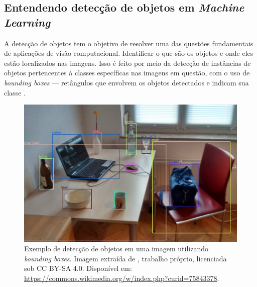 \subsection{Entendendo detecção de objetos em \emph{Machine Learning}}
A detecção de objetos tem o objetivo de resolver uma das questões fundamentais de aplicações de visão computacional. Identificar o que são os objetos e onde eles estão localizados nas imagens. Isso é feito por meio da detecção de instâncias de objetos pertencentes à classes específicas nas imagens em questão, com o uso de \emph{bounding boxes} --- retângulos que envolvem os objetos detectados e indicam sua classe \citep{Zou2019Object}.

\begin{figure}[htb!]
    \centering
    \includegraphics[width=0.8\linewidth]{images/bounding_boxes.png}
    \caption{\label{fig:bounding_boxes} Exemplo de detecção de objetos em uma imagem utilizando \emph{bounding boxes}. Imagem extraída de \citeauthor{MTheiler}, trabalho próprio, licenciada sob CC BY-SA 4.0. Disponível em: \url{https://commons.wikimedia.org/w/index.php?curid=75843378}.}
\end{figure}

